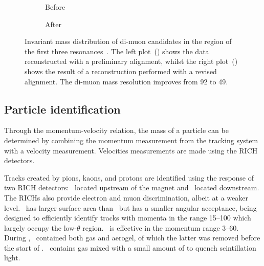 \begin{figure}
  \begin{subfigure}{0.5\textwidth}
    \centering
    
    \caption{Before}
    \label{fig:intro:lhcb:alignment:pre}
  \end{subfigure}
  \begin{subfigure}{0.5\textwidth}
    \centering
    
    \caption{After}
    \label{fig:intro:lhcb:alignment:post}
  \end{subfigure}
  \caption{%
    Invariant mass distribution of di-muon candidates in the region of the 
    first three \PUpsilon resonances~\cite{Dujany:082010}.
    The left plot~() shows the data 
    reconstructed with a preliminary alignment, whilst the right 
    plot~() shows the result of a 
    reconstruction performed with a revised alignment.
    The di-muon mass resolution improves from \SI{92}{\MeVcc} to 
    \SI{49}{\MeVcc}.
  }
  \label{fig:intro:lhcb:alignment}
\end{figure}

\subsection{Particle identification}
\label{chap:intro:lhcb:detector:pid}

Through the momentum-velocity relation, the mass of a particle can be 
determined by combining the momentum measurement from the tracking system with 
a velocity measurement.
Velocities measurements are made using the \ac{RICH} detectors.

Tracks created by pions, kaons, and protons are identified using the response 
of two \ac{RICH} detectors: \richone\ located upstream of the magnet and 
\richtwo\ located downstream.
The \acp{RICH} also provide electron and muon discrimination, albeit at a 
weaker level.
\richtwo\ has larger surface area than \richone\ but has a smaller angular 
acceptance, being designed to efficiently identify tracks with momenta in the 
range \SIrange{15}{100}{\GeVc} which largely occupy the low-$\theta$ region.
\richone\ is effective in the momentum range \SIrange{3}{60}{\GeVc}.
During \runone, \richone\ contained both  gas and aerogel, of which 
the latter was removed before the start of \runtwo.
\richtwo\ contains  gas mixed with a small amount of  to quench 
scintillation light.


